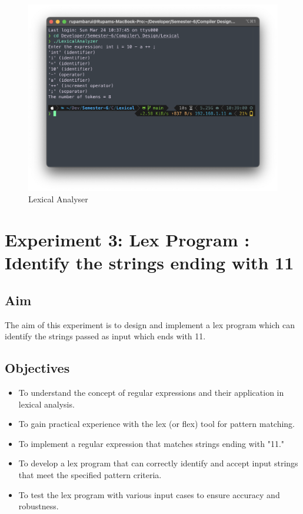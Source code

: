 \documentclass[12pt]{article}
\begin{document}
\begin{figure}[H]
    \centering
    \includegraphics[width=1\linewidth]{exp2output.png}
    \caption{Lexical Analyser}
\end{figure}

\newpage
\section*{Experiment 3: Lex Program : Identify the strings ending with 11}

\subsection*{Aim}
The aim of this experiment is to design and implement a lex program which can identify the strings passed as input which ends with 11.

\subsection*{Objectives}
\begin{itemize}
    \item To understand the concept of regular expressions and their application in lexical analysis.
    \item To gain practical experience with the lex (or flex) tool for pattern matching.
    \item To implement a regular expression that matches strings ending with "11."
    \item To develop a lex program that can correctly identify and accept input strings that meet the specified pattern criteria.
    \item To test the lex program with various input cases to ensure accuracy and robustness.
\end{itemize}
\end{document}
